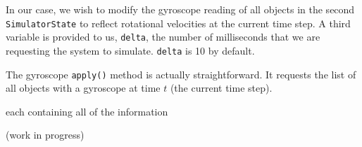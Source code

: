 \documentclass[12pt]{article}
\newcommand{\code}[1]{\texttt{#1}}
\begin{document}
In our case, we wish to modify the gyroscope reading of all
objects in the second \code{SimulatorState} to reflect rotational velocities
at the current time step. A third variable is provided to us, \code{delta},
the number of milliseconds that we are requesting the system to simulate.
\code{delta} is 10 by default. 

The gyroscope \code{apply()} method is actually straightforward. It requests
the list of all objects with a gyroscope at time $t$ (the current time step).

each containing all of the information 

(work in progress)
\end{document}
